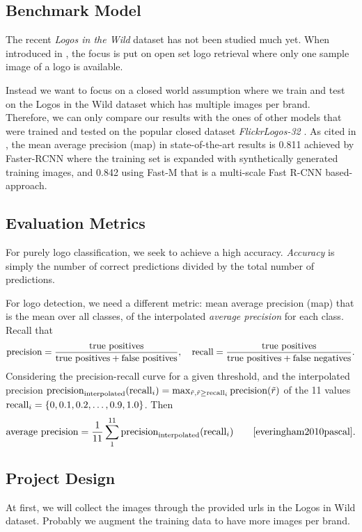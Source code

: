 \documentclass{scrartcl}
\begin{document}
\subsection*{Benchmark Model}

The recent \emph{Logos in the Wild} dataset has not been studied much yet. When introduced in \cite{logosinthewild}, the focus is put on open set logo retrieval where only one sample image of a logo is available. 

Instead we want to focus on a closed world assumption where we train and test on the Logos in the Wild dataset which has multiple images per brand. 
Therefore, we can only compare our results with the ones of other models that were trained and tested on the popular closed dataset \emph{FlickrLogos-32} \cite{flickrlogos32}. As cited in \cite{logosinthewild}, the mean average precision (map) in state-of-the-art results is 0.811 achieved by Faster-RCNN \cite{DBLP:journals/corr/SuZG16}  where the training set is expanded with synthetically generated training images, and 0.842 using
Fast-M \cite{Bao:2016:RCL:3007669.3007728} that is a multi-scale Fast R-CNN based-approach.

\subsection*{Evaluation Metrics}

For purely logo classification, we seek to achieve a high accuracy. \emph{Accuracy} is simply the number of correct predictions divided by the total number of predictions.

For logo detection, we need a different metric: mean average precision (map) that is the mean over all classes, of the interpolated
\emph{average precision} \cite{everingham2010pascal} for each class. Recall that
\[
\textup{precision}=\frac{\textup{true positives}}{\textup{true positives}+\textup{false positives}},\quad \textup{recall}=\frac{\textup{true positives}}{\textup{true positives}+\textup{false negatives}}.
\]
Considering the precision-recall curve for a given threshold, and the interpolated precision $\textup{precision}_\textup{interpolated}(\textup{recall}_i)=\max_{\tilde{r},\tilde{r}\geq \textup{recall}_i}\textup{precision}(\tilde{r})$ of the 11 values $\textup{recall}_i=\{0,0.1,0.2,\ldots,0.9,1.0\}$. Then
\[
\textup{average precision}=\frac{1}{11}\sum_{1}^{11}\textup{precision}_\textup{interpolated}(\textup{recall}_i)\qquad\cite[\S\,4.2]{everingham2010pascal}.
\]

\subsection*{Project Design}
At first, we will collect the images through the provided urls in the Logos in Wild dataset.
Probably we augment the training data to have more images per brand. 
\end{document}
